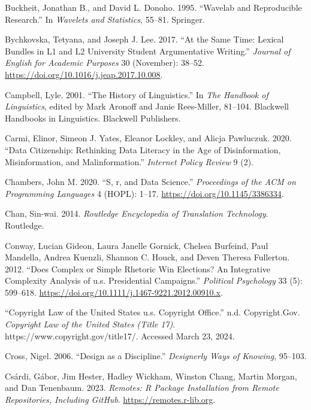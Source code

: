 \documentclass[
  letterpaper,
]{latex/krantz}
\newlength{\cslhangindent}
\newenvironment{CSLReferences}[2] %
 {\begin{list}{}{%
  \setlength{\itemindent}{0pt}
  \setlength{\leftmargin}{0pt}
  \setlength{\parsep}{0pt}
  \ifodd #1
   \setlength{\leftmargin}{\cslhangindent}
   \setlength{\itemindent}{-1\cslhangindent}
  \fi
  \setlength{\itemsep}{#2\baselineskip}}}
 {\end{list}}
\theoremstyle{definition}
\theoremstyle{remark}
\begin{document}
\begin{CSLReferences}{1}{0}
Buckheit, Jonathan B., and David L. Donoho. 1995. {``Wavelab and
Reproducible Research.''} In \emph{Wavelets and Statistics}, 55--81.
Springer.

Bychkovska, Tetyana, and Joseph J. Lee. 2017. {``At the Same Time:
Lexical Bundles in L1 and L2 University Student Argumentative
Writing.''} \emph{Journal of English for Academic Purposes} 30
(November): 38--52. \url{https://doi.org/10.1016/j.jeap.2017.10.008}.

Campbell, Lyle. 2001. {``The History of Linguistics.''} In \emph{The
Handbook of Linguistics}, edited by Mark Aronoff and Janie Rees-Miller,
81--104. Blackwell Handbooks in Linguistics. Blackwell Publishers.

Carmi, Elinor, Simeon J. Yates, Eleanor Lockley, and Alicja Pawluczuk.
2020. {``Data Citizenship: Rethinking Data Literacy in the Age of
Disinformation, Misinformation, and Malinformation.''} \emph{Internet
Policy Review} 9 (2).

Chambers, John M. 2020. {``S, r, and Data Science.''} \emph{Proceedings
of the ACM on Programming Languages} 4 (HOPL): 1--17.
\url{https://doi.org/10.1145/3386334}.

Chan, Sin-wai. 2014. \emph{Routledge Encyclopedia of Translation
Technology}. Routledge.

Conway, Lucian Gideon, Laura Janelle Gornick, Chelsea Burfeind, Paul
Mandella, Andrea Kuenzli, Shannon C. Houck, and Deven Theresa Fullerton.
2012. {``Does Complex or Simple Rhetoric Win Elections? An Integrative
Complexity Analysis of u.s. Presidential Campaigns.''} \emph{Political
Psychology} 33 (5): 599--618.
\url{https://doi.org/10.1111/j.1467-9221.2012.00910.x}.

{``Copyright Law of the United States {\textbar} u.s. Copyright
Office.''} n.d. Copyright.Gov. \emph{Copyright Law of the United States
(Title 17)}. https://www.copyright.gov/title17/. Accessed March 23,
2024.

Cross, Nigel. 2006. {``Design as a Discipline.''} \emph{Designerly Ways
of Knowing}, 95--103.

Csárdi, Gábor, Jim Hester, Hadley Wickham, Winston Chang, Martin Morgan,
and Dan Tenenbaum. 2023. \emph{Remotes: R Package Installation from
Remote Repositories, Including GitHub}. \url{https://remotes.r-lib.org}.


\end{CSLReferences}
\end{document}
